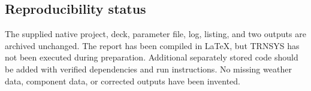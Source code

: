 \documentclass[11pt,a4paper]{article}
\begin{document}
\subsection{Reproducibility status}
The supplied native project, deck, parameter file, log, listing, and two outputs are archived unchanged. The report has been compiled in LaTeX, but TRNSYS has not been executed during preparation. Additional separately stored code should be added with verified dependencies and run instructions. No missing weather data, component data, or corrected outputs have been invented.
\end{document}
